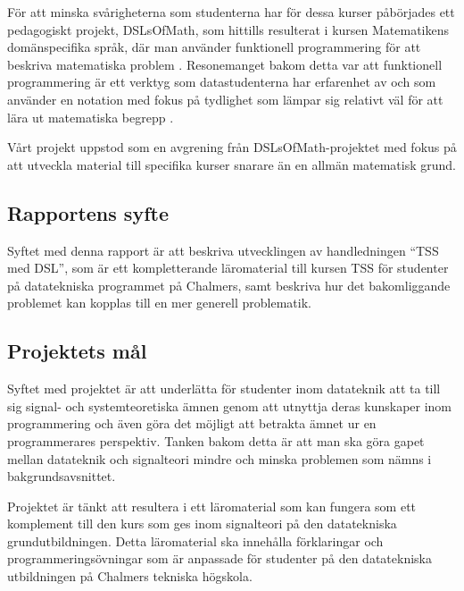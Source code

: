 \documentclass[]{article}
\begin{document}
För att minska svårigheterna som studenterna har för dessa kurser påbörjades
ett pedagogiskt projekt, DSLsOfMath, som hittills resulterat i kursen
Matematikens domänspecifika språk, där man använder funktionell
programmering för att beskriva matematiska problem \cite{kursplan:dslsofmath}.
Resonemanget bakom detta var att funktionell programmering är ett verktyg
som datastudenterna har erfarenhet av och som använder en notation med
fokus på tydlighet som lämpar sig relativt väl för att lära ut matematiska
begrepp \cite{TFPIE15_DSLsofMath_IonescuJansson}.

Vårt projekt uppstod som en avgrening från DSLsOfMath-projektet med fokus på att utveckla material till specifika kurser snarare än en allmän matematisk grund.

\subsection{Rapportens syfte}



Syftet med denna rapport är att beskriva utvecklingen av handledningen “TSS med DSL”, som är ett kompletterande läromaterial till kursen TSS för studenter på datatekniska programmet på Chalmers, samt beskriva hur det bakomliggande problemet kan kopplas till en mer generell problematik. 

\subsection{Projektets mål}
Syftet med projektet är att underlätta för studenter inom datateknik att ta till sig signal- och systemteoretiska ämnen genom att utnyttja deras kunskaper inom programmering och även göra det möjligt att betrakta ämnet ur en programmerares perspektiv. Tanken bakom detta är att man ska göra gapet mellan datateknik och signalteori mindre och minska problemen som nämns i bakgrundsavsnittet.

Projektet är tänkt att resultera i ett läromaterial som kan fungera som ett komplement till den kurs som ges inom signalteori på den datatekniska grundutbildningen. Detta läromaterial ska innehålla förklaringar och programmeringsövningar som är anpassade för studenter på den datatekniska utbildningen på Chalmers tekniska högskola.
\end{document}

